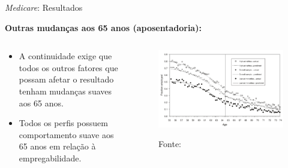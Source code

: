 \documentclass[aspectratio=1610, 10pt]{beamer}
\begin{document}
\begin{frame}{\textit{Medicare}: Resultados}

\textbf{Outras mudanças aos 65 anos (aposentadoria):}
\vspace{0.1cm}

\begin{columns}[T] %
	\begin{column}{0.4\linewidth} %
    \begin{itemize}
        \item A continuidade exige que todos os outros fatores que possam afetar o resultado tenham mudanças suaves aos 65 anos.
        \item Todos os perfis possuem comportamento suave aos 65 anos em relação à empregabilidade.
    \end{itemize}
    \end{column}
 	\begin{column}{0.6\linewidth} %
        \begin{figure}
            \centering
            \vspace{-0.43cm}
            \includegraphics[scale = 0.4]{FigurasAplicacao/figuraAposentadoria.png}

            \tiny{Fonte: \cite{card2008impact}}
            \label{fig_aposentadoria}
        \end{figure}
    \end{column}
\end{columns}
\end{frame}
\end{document}
